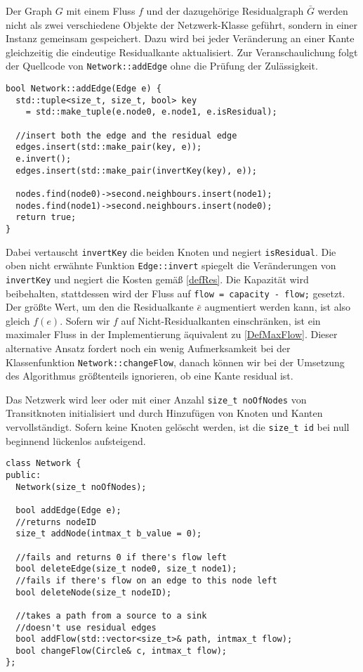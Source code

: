 Der Graph $G$ mit einem Fluss $f$ und der dazugehörige Residualgraph $\bar{G}$ werden nicht als zwei verschiedene Objekte der Netzwerk-Klasse geführt, sondern in einer Instanz gemeinsam gespeichert. Dazu wird bei jeder Veränderung an einer Kante gleichzeitig die eindeutige Residualkante aktualisiert. Zur Veranschaulichung folgt der Quellcode von \lstinline|Network::addEdge| ohne die Prüfung der Zulässigkeit.

\begin{lstlisting}
bool Network::addEdge(Edge e) {
  std::tuple<size_t, size_t, bool> key
    = std::make_tuple(e.node0, e.node1, e.isResidual);

  //insert both the edge and the residual edge
  edges.insert(std::make_pair(key, e));
  e.invert();
  edges.insert(std::make_pair(invertKey(key), e));

  nodes.find(node0)->second.neighbours.insert(node1);
  nodes.find(node1)->second.neighbours.insert(node0);
  return true;
}
\end{lstlisting}

Dabei vertauscht \lstinline|invertKey| die beiden Knoten und negiert \lstinline|isResidual|. Die oben nicht erwähnte Funktion \lstinline|Edge::invert| spiegelt die Veränderungen von \lstinline|invertKey| und negiert die Kosten gemäß \cref{defRes}. Die Kapazität wird beibehalten, stattdessen wird der Fluss auf \lstinline|flow = capacity - flow;| gesetzt. Der größte Wert, um den die Residualkante $\bar{e}$ augmentiert werden kann, ist also gleich $f(e)$. Sofern wir $f$ auf Nicht-Residualkanten einschränken, ist ein maximaler Fluss in der Implementierung äquivalent zu \cref{DefMaxFlow}. Dieser alternative Ansatz fordert noch ein wenig Aufmerksamkeit bei der Klassenfunktion \lstinline|Network::changeFlow|,\footnotemark{} danach können wir bei der Umsetzung des Algorithmus größtenteils ignorieren, ob eine Kante residual ist.


Das Netzwerk wird leer oder mit einer Anzahl \lstinline|size_t noOfNodes| von Transitknoten initialisiert und durch Hinzufügen von Knoten und Kanten vervollständigt. Sofern keine Knoten gelöscht werden, ist die \lstinline|size_t id| bei null beginnend lückenlos aufsteigend.

\begin{lstlisting}
class Network {
public:
  Network(size_t noOfNodes);

  bool addEdge(Edge e);
  //returns nodeID
  size_t addNode(intmax_t b_value = 0);
  
  //fails and returns 0 if there's flow left
  bool deleteEdge(size_t node0, size_t node1);
  //fails if there's flow on an edge to this node left
  bool deleteNode(size_t nodeID);

  //takes a path from a source to a sink
  //doesn't use residual edges
  bool addFlow(std::vector<size_t>& path, intmax_t flow);
  bool changeFlow(Circle& c, intmax_t flow);
};
\end{lstlisting}

